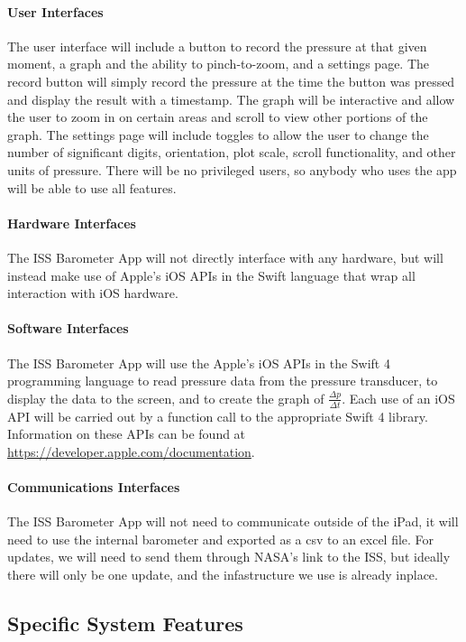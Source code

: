 \documentclass[onecolumn, draftclsnofoot,10pt, compsoc]{IEEEtran}
\def \CapstoneProjectName{ISS Barometer App }
\begin{document}
\paragraph{User Interfaces}
The user interface will include a button to record the pressure at that given moment, a graph and the ability to pinch-to-zoom, and a settings page.
The record button will simply record the pressure at the time the button was pressed and display the result with a timestamp.
The graph will be interactive and allow the user to zoom in on certain areas and scroll to view other portions of the graph.
The settings page will include toggles to allow the user to change the number of significant digits, orientation, plot scale, scroll functionality, and other units of pressure.
There will be no privileged users, so anybody who uses the app will be able to use all features.

\paragraph{Hardware Interfaces}
The \CapstoneProjectName will not directly interface with any hardware, but will instead make use of Apple's iOS APIs in the Swift language that wrap all interaction with iOS hardware.

\paragraph{Software Interfaces}
The \CapstoneProjectName will use the Apple's iOS APIs in the Swift 4 programming language to read pressure data from the pressure transducer, to display the data to the screen, and to create the graph of $\frac{\Delta p}{\Delta t}$.
Each use of an iOS API will be carried out by a function call to the appropriate Swift 4 library. Information on these APIs can be found at \url{https://developer.apple.com/documentation}.

\paragraph{Communications Interfaces}
The ISS Barometer App will not need to communicate outside of the iPad, it will need to use the internal barometer and exported as a csv to an excel file.
For updates, we will need to send them through NASA's link to the ISS, but ideally there will only be one update, and the infastructure we use is already inplace.
\subsection{Specific System Features}
\end{document}
